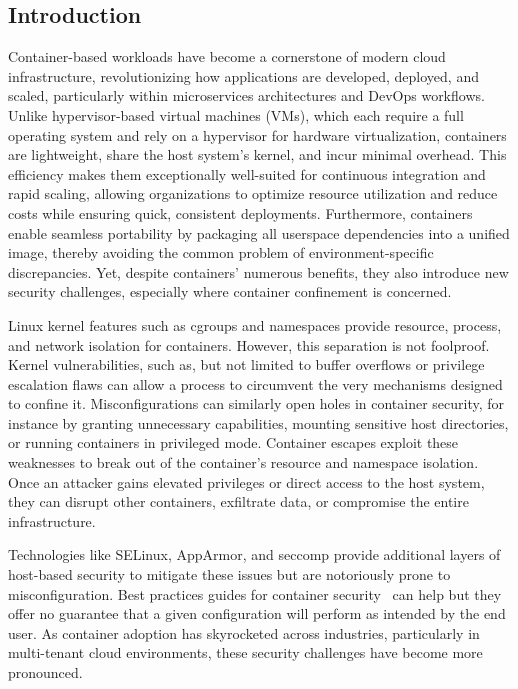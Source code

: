 \documentclass[12pt]{report}
\begin{document}
\begin{doublespace}
\chapter{Introduction}

Container-based workloads have become a cornerstone of modern cloud infrastructure, revolutionizing how applications are developed, deployed, and scaled, particularly within microservices architectures and DevOps workflows. Unlike hypervisor-based virtual machines (VMs), which each require a full operating system and rely on a hypervisor for hardware virtualization, containers are lightweight, share the host system’s kernel, and incur minimal overhead. This efficiency makes them exceptionally well-suited for continuous integration and rapid scaling, allowing organizations to optimize resource utilization and reduce costs while ensuring quick, consistent deployments. Furthermore, containers enable seamless portability by packaging all userspace dependencies into a unified image, thereby avoiding the common problem of environment-specific discrepancies. Yet, despite containers’ numerous benefits, they also introduce new security challenges, especially where container confinement is concerned.

Linux kernel features such as cgroups and namespaces provide resource, process, and network isolation for containers. However, this separation is not foolproof. Kernel vulnerabilities, such as, but not limited to buffer overflows or privilege escalation flaws can allow a process to circumvent the very mechanisms designed to confine it. Misconfigurations can similarly open holes in container security, for instance by granting unnecessary capabilities, mounting sensitive host directories, or running containers in privileged mode. Container escapes exploit these weaknesses to break out of the container’s resource and namespace isolation. Once an attacker gains elevated privileges or direct access to the host system, they can disrupt other containers, exfiltrate data, or compromise the entire infrastructure. 

Technologies like SELinux, AppArmor, and seccomp provide additional layers of host-based security to mitigate these issues but are notoriously prone to misconfiguration. Best practices guides for container security~\cite{CIS} can help but they offer no guarantee that a given configuration will perform as intended by the end user. As container adoption has skyrocketed across industries, particularly in multi-tenant cloud environments, these security challenges have become more pronounced.


\end{doublespace}
\end{document}
